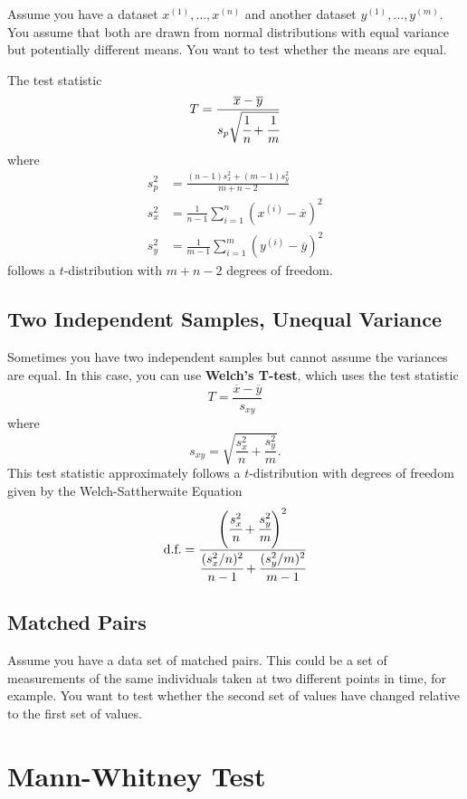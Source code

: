 Assume you have a dataset $x^{(1)}, \dots, x^{(n)}$ and another dataset $y^{(1)}, \dots, y^{(m)}$. You assume that both are drawn from normal distributions with equal variance but potentially different means. You want to test whether the means are equal.

The test statistic
$$ T = \frac{\overline{x} - \overline{y}}{s_p \sqrt{\cfrac{1}{n} + \cfrac{1}{m}}} $$
where
\begin{align*} s_p^2 &= \frac{(n-1) s_x^2 + (m-1) s_y^2}{m + n - 2} \\
s_x^2 &= \frac{1}{n-1} \sum_{i=1}^n (x^{(i)} - \overline{x})^2 \\
s_y^2 &= \frac{1}{m-1} \sum_{i=1}^m (y^{(i)} - \overline{y})^2 \end{align*}
follows a $t$-distribution with $m + n - 2$ degrees of freedom.

\subsection{Two Independent Samples, Unequal Variance}

Sometimes you have two independent samples but cannot assume the variances are equal. In this case, you can use \textbf{Welch's T-test}, which uses the test statistic
$$ T = \frac{\overline{x} - \overline{y}}{s_{xy}} $$
where 
$$ s_{xy} = \sqrt{\frac{s_x^2}{n} + \frac{s_y^2}{m}}. $$
This test statistic approximately follows a $t$-distribution with degrees of freedom given by the {Welch-Sattherwaite Equation}
$$ \text{d.f.} = \frac{\left(\cfrac{s_x^2}{n} + \cfrac{s_y^2}{m} \right)^2}{\cfrac{(s_x^2/n)^2}{n-1} + \cfrac{(s_y^2/m)^2}{m-1}} $$ 

\subsection{Matched Pairs}

Assume you have a data set of matched pairs. This could be a set of measurements of the same individuals taken at two different points in time, for example. You want to test whether the second set of values have changed relative to the first set of values.


\section{Mann-Whitney Test}

